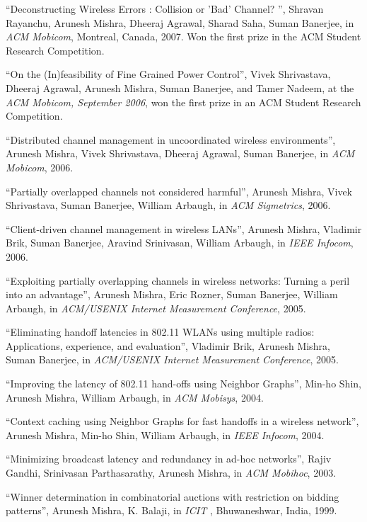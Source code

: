 \begin{resume}
\mybullet ``Deconstructing Wireless Errors : Collision or 'Bad' Channel? '', Shravan Rayanchu, Arunesh Mishra, Dheeraj Agrawal, Sharad Saha, Suman Banerjee,
in {\it ACM Mobicom}, Montreal, Canada, 2007. Won the first prize in the {ACM Student Research Competition}.

\mybullet ``On the (In)feasibility of Fine Grained Power Control'', Vivek Shrivastava, Dheeraj Agrawal, Arunesh Mishra, Suman Banerjee, and Tamer Nadeem,
at the {\it ACM Mobicom,  September 2006}, won the first prize in an {ACM Student Research Competition}.

\mybullet ``Distributed channel management in uncoordinated wireless environments'', Arunesh Mishra, Vivek Shrivastava,
Dheeraj Agrawal, Suman Banerjee, in {\em ACM Mobicom}, 2006.

\mybullet ``Partially overlapped channels not considered harmful'', Arunesh Mishra, Vivek Shrivastava, Suman Banerjee, William
Arbaugh, in {\em ACM Sigmetrics}, 2006.

\mybullet ``Client-driven channel management in wireless LANs'', Arunesh Mishra, Vladimir Brik, Suman Banerjee, Aravind
Srinivasan, William Arbaugh, in {\em IEEE Infocom}, 2006.

\mybullet ``Exploiting partially overlapping channels in wireless networks: Turning a peril into an advantage'',
Arunesh Mishra, Eric Rozner, Suman Banerjee, William Arbaugh, in  {\em  ACM/USENIX Internet Measurement Conference}, 2005.

\mybullet ``Eliminating handoff latencies in 802.11 WLANs using multiple radios: Applications, experience, and evaluation'', 
Vladimir Brik, Arunesh Mishra, Suman Banerjee, in {\em ACM/USENIX Internet Measurement Conference}, 2005.

\mybullet ``Improving the latency of 802.11 hand-offs using Neighbor Graphs'',
Min-ho Shin, Arunesh Mishra, William Arbaugh, in {\em ACM Mobisys},  2004.

\mybullet ``Context caching using Neighbor Graphs for fast handoffs in a wireless network'', Arunesh Mishra, 
Min-ho Shin, William Arbaugh, in {\em  IEEE Infocom}, 2004.

\mybullet ``Minimizing broadcast latency and redundancy in ad-hoc networks'', Rajiv Gandhi, Srinivasan Parthasarathy, 
Arunesh Mishra, in {\em ACM Mobihoc}, 2003.

\mybullet ``Winner determination in combinatorial auctions with restriction on bidding patterns'', Arunesh Mishra, 
K. Balaji, in {\em ICIT }, Bhuwaneshwar, India, 1999.


\end{resume}
